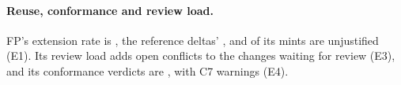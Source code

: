 \paragraph{Reuse, conformance and review load.} FP's extension rate is , the reference %
deltas' , and  of its mints are unjustified (E1). Its
review load adds  open conflicts to the  changes waiting for review
(E3), and its conformance verdicts are , with  C7 warnings (E4).


